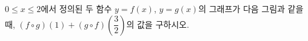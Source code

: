 \hspace*{2mm}\begin{minipage}[t]{\dimexpr\linewidth-2mm\relax}\vspace{0pt}
$0\le x\le 2$에서 정의된 두 함수 $y=f(x)$, $y=g(x)$의 그래프가 다음 그림과 같을 때, $(f\circ g)(1)+(g\circ f)\left(\dfrac{3}{2}\right)$의 값을 구하시오.
\par\smallskip\begin{center}\resizebox{\ifdim\width>\linewidth\linewidth\else\width\fi}{!}{}\end{center}\end{minipage}

